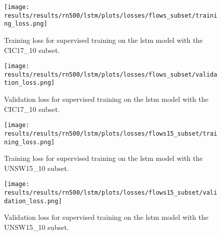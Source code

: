 







\begin{figure}[!htbp]
	\centering
	\texttt{[image: results/results/rn500/lstm/plots/losses/flows\_subset/training\_loss.png]}
	\caption{Training loss for supervised training on the \gls{lstm} model with the CIC17\_10 subset.}
	\label{fig:results:lstm:training_loss_flows_subset}
\end{figure}

\begin{figure}[!htbp]
	\centering
	\texttt{[image: results/results/rn500/lstm/plots/losses/flows\_subset/validation\_loss.png]}
	\caption{Validation loss for supervised training on the \gls{lstm} model with the CIC17\_10 subset.}
	\label{fig:results:lstm:validation_loss_flows_subset}
\end{figure}













\begin{figure}[!htbp]
	\centering
	\texttt{[image: results/results/rn500/lstm/plots/losses/flows15\_subset/training\_loss.png]}
	\caption{Training loss for supervised training on the \gls{lstm} model with the UNSW15\_10 subset.}
	\label{fig:results:lstm:training_loss_flows15_subset}
\end{figure}

\begin{figure}[!htbp]
	\centering
	\texttt{[image: results/results/rn500/lstm/plots/losses/flows15\_subset/validation\_loss.png]}
	\caption{Validation loss for supervised training on the \gls{lstm} model with the UNSW15\_10 subset.}
	\label{fig:results:lstm:validation_loss_flows15_subset}
\end{figure}


